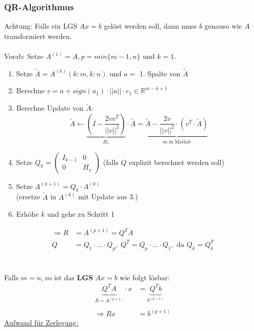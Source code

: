 \documentclass[a4paper,twocolumn,10pt]{article}
\begin{document}
\subsubsection{QR-Algorithmus}
Achtung: Falls ein LGS $Ax=b$ gelöst werden soll, dann muss $b$ genauso wie $A$ transformiert werden.\\\\
Vorab: Setze $A^{(1)}=A,p=min\{m-1,n\}$ und $k=1$.
\begin{enumerate}
\item Setze $\tilde{A}=A^{(k)}(k:m,k:n)$ und $a=$ 1. Spalte von $\tilde{A}$
\item Berechne $v=a+sign(a_1)\cdot ||a||\cdot e_1\in\mathbb{R}^{m-k+1}$
\item Berechne Update von $\tilde{A}$:
\begin{equation*}
\tilde{A}\leftarrow\underbrace{\left(I-\frac{2vv^T}{||v||^2}\right)}_{H_v}\cdot\tilde{A}=\underbrace{\tilde{A}-\frac{2v}{||v||^2}\cdot\left(v^T\cdot\tilde{A}\right)}_{\text{so in Matlab}}
\end{equation*}
\item Setze $Q_k=\begin{pmatrix}I_{k-1} & 0 \\ 0 & H_v\end{pmatrix}$ (falls $Q$ explizit berechnet werden soll)
\item Setze $A^{(k+1)}=Q_k\cdot A^{(k)}$\\
(ersetze $\tilde{A}$ in $A^{(k)}$ mit Update aus 3.)
\item Erhöhe $k$ und gehe zu Schritt 1
\end{enumerate}
\begin{equation*}
\begin{split}
\Rightarrow R&=A^{(p+1)}=Q^TA\\
Q&=Q_1\cdot ...\cdot Q_p,\;Q^T=Q_p\cdot ...\cdot Q_1,\text{ da }Q_k=Q_k^T
\end{split}
\end{equation*}\\\\
Falls $m=n$, so ist das \textbf{LGS} $Ax=b$ wie folgt lösbar:
\begin{equation*}
\begin{split}
\underbrace{Q^TA}_{R=A^{(p+1)}}\cdot x&=\underbrace{Q^Tb}_{b^{(p+1)}}\\\\
\Rightarrow Rx&=b^{(p+1)}
\end{split}
\end{equation*}
\underline{Aufwand für Zerlegung:}\\\\
\end{document}
